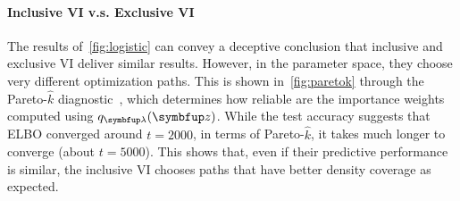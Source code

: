 \vspace{-0.1in}
\paragraph{Inclusive VI v.s. Exclusive VI}
The results of~\cref{fig:logistic} can convey a deceptive conclusion that inclusive and exclusive VI deliver similar results.
However, in the parameter space, they choose very different optimization paths.
This is shown in~\cref{fig:paretok} through the Pareto-\(\widehat{k}\) diagnostic~\citep{NEURIPS2020_7cac11e2, vehtari_pareto_2021}, which determines how reliable are the importance weights computed using \(q_{\vlambda}(\vz)\).
While the test accuracy suggests that ELBO converged around \(t=2000\), in terms of Pareto-\(\widehat{k}\), it takes much longer to converge (about \(t=5000\)).
This shows that, even if their predictive performance is similar, the inclusive VI chooses paths that have better density coverage as expected.

